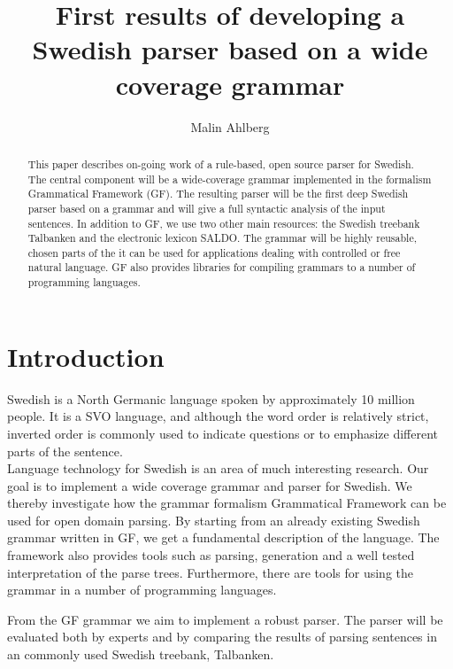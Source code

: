 \documentclass[submission]{eptcs} %
\title{First results of developing a Swedish parser based on a wide coverage grammar}
\author{Malin Ahlberg
\institute{Department of Computer Science \& Engineering, Gothenburg University, Sweden}
}
\begin{document}
\maketitle

\begin{abstract}
This paper describes on-going work of a rule-based, open source
parser for Swedish. The central component will be a wide-coverage grammar
implemented in the formalism Grammatical Framework (GF). The
resulting parser will be the first deep Swedish parser based on a grammar and
will give a full syntactic analysis of the input sentences.
In addition to GF, we use two other main resources: the Swedish
treebank Talbanken and the electronic lexicon SALDO.
The grammar will be highly reusable, chosen 
parts of the it can be used for applications dealing with controlled 
or free natural language. GF also provides libraries for compiling
grammars to a number of programming languages.

\end{abstract}

\section{Introduction}
Swedish is a North Germanic language spoken by approximately 10 million people.
It is a SVO language, and although the word order is relatively strict,
inverted order is commonly used
to indicate questions or to emphasize different parts of the sentence. \\
Language technology for Swedish is an area of much interesting research.
Our goal is to implement a wide coverage grammar and parser for Swedish.
We thereby investigate how the grammar formalism Grammatical Framework
can be used for open domain parsing.
By starting from an already existing Swedish grammar written in GF, we get 
a fundamental description of the language. The framework also provides
tools such as parsing, generation and
a well tested interpretation of the parse trees. Furthermore, there are tools
for using the grammar in a number of programming languages. 

From the GF grammar we aim to implement a robust parser. 
The parser will be evaluated both by experts and by comparing the results of
parsing sentences in an commonly used Swedish treebank, Talbanken.
\end{document}
